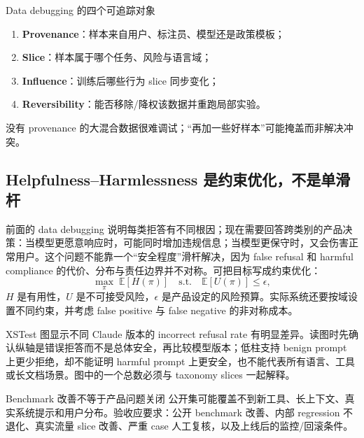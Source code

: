 \begin{importantbox}{Data debugging 的四个可追踪对象}
\begin{enumerate}
  \item \textbf{Provenance}：样本来自用户、标注员、模型还是政策模板；
  \item \textbf{Slice}：样本属于哪个任务、风险与语言域；
  \item \textbf{Influence}：训练后哪些行为 slice 同步变化；
  \item \textbf{Reversibility}：能否移除/降权该数据并重跑局部实验。
\end{enumerate}
没有 provenance 的大混合数据很难调试；“再加一些好样本”可能掩盖而非解决冲突。
\end{importantbox}


\subsection{Helpfulness--Harmlessness 是约束优化，不是单滑杆}

前面的 data debugging 说明每类拒答有不同根因；现在需要回答跨类别的产品决策：当模型更愿意响应时，可能同时增加违规信息；当模型更保守时，又会伤害正常用户。这个问题不能靠一个“安全程度”滑杆解决，因为 false refusal 和 harmful compliance 的代价、分布与责任边界并不对称。可把目标写成约束优化：
\[
\max_{\pi}\;\mathbb{E}[H(\pi)]
\quad \text{s.t.}\quad
\mathbb{E}[U(\pi)]\le \epsilon,
\]
$H$ 是有用性，$U$ 是不可接受风险，$\epsilon$ 是产品设定的风险预算。实际系统还要按域设置不同约束，并考虑 false positive 与 false negative 的非对称成本。



XSTest 图显示不同 Claude 版本的 incorrect refusal rate 有明显差异。读图时先确认纵轴是错误拒答而不是总体安全，再比较模型版本；低柱支持 benign prompt 上更少拒绝，却不能证明 harmful prompt 上更安全，也不能代表所有语言、工具或长文档场景。图中的一个总数必须与 taxonomy slices 一起解释。

\begin{warningbox}{Benchmark 改善不等于产品问题关闭}
公开集可能覆盖不到新工具、长上下文、真实系统提示和用户分布。验收应要求：公开 benchmark 改善、内部 regression 不退化、真实流量 slice 改善、严重 case 人工复核，以及上线后的监控/回滚条件。
\end{warningbox}

